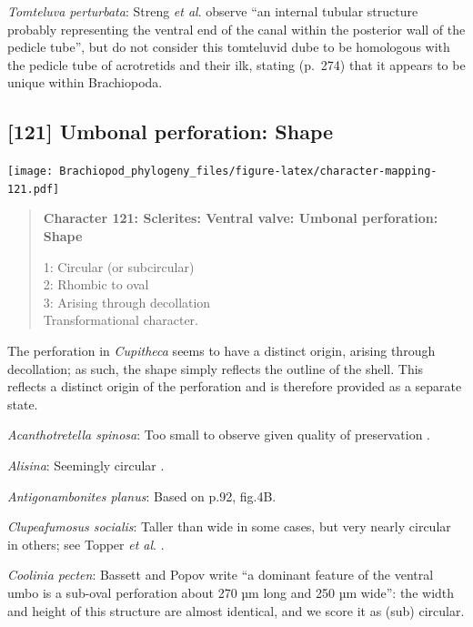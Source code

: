 \documentclass[openany]{book}
\begin{document}
\hypertarget{Tomteluva_perturbata-coding-120}{}
\emph{Tomteluva perturbata}: Streng \emph{et al}.
\citeyearpar{Streng2016Anew} observe ``an internal tubular structure
probably representing the ventral end of the canal within the posterior
wall of the pedicle tube'', but do not consider this tomteluvid dube to
be homologous with the pedicle tube of acrotretids and their ilk,
stating (p.~274) that it appears to be unique within Brachiopoda.

\subsection*{{[}121{]} Umbonal perforation:
Shape}\label{umbonal-perforation-shape}

\texttt{[image: Brachiopod\_phylogeny\_files/figure-latex/character-mapping-121.pdf]}

\begin{quote}
\textbf{Character 121: Sclerites: Ventral valve: Umbonal perforation:
Shape}

1: Circular (or subcircular)\\
2: Rhombic to oval\\
3: Arising through decollation\\
Transformational character.
\end{quote}

The perforation in \emph{Cupitheca} seems to have a distinct origin,
arising through decollation; as such, the shape simply reflects the
outline of the shell. This reflects a distinct origin of the perforation
and is therefore provided as a separate state.

\hypertarget{Acanthotretella_spinosa-coding-121}{}
\emph{Acanthotretella spinosa}: Too small to observe given quality of
preservation \citep{Holmer2006Aspinose}.

\hypertarget{Alisina-coding-121}{}
\emph{Alisina}: Seemingly circular \citep{Zhang2011Anobolellate}.

\hypertarget{Antigonambonites_planus-coding-121}{}
\emph{Antigonambonites planus}: Based on p.92, fig.4B.

\hypertarget{Clupeafumosus_socialis-coding-121}{}
\emph{Clupeafumosus socialis}: Taller than wide in some cases, but very
nearly circular in others; see Topper \emph{et al}.
\citeyearpar{Topper2013Reappraisalof}.

\hypertarget{Coolinia_pecten-coding-121}{}
\emph{Coolinia pecten}: Bassett and Popov write ``a dominant feature of
the ventral umbo is a sub-oval perforation about 270 µm long and 250 µm
wide'': the width and height of this structure are almost identical, and
we score it as (sub) circular.
\end{document}
